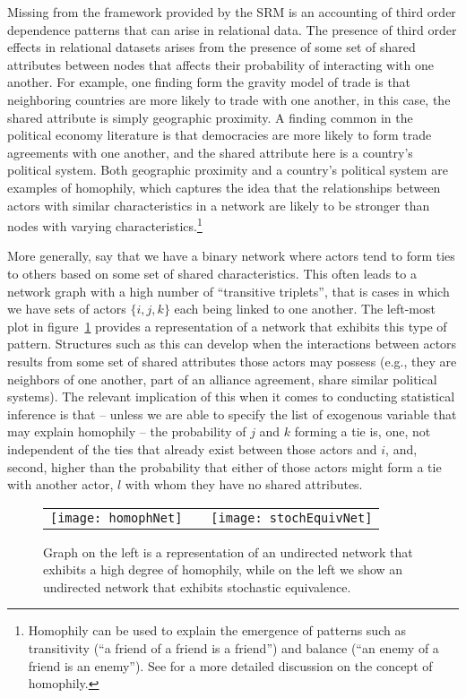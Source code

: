 Missing from the framework provided by the SRM is an accounting of third order dependence patterns that can arise in relational data. The presence of third order effects in relational datasets arises from the presence of some set of shared attributes between nodes that affects their probability of interacting with one another. For example, one finding form the gravity model of trade is that neighboring countries are more likely to trade with one another, in this case, the shared attribute is simply geographic proximity. A finding common in the political economy literature is that democracies are more likely to form trade agreements with one another, and the shared attribute here is a country's political system. Both geographic proximity and a country's political system are examples of homophily, which captures the idea that the relationships between actors with similar characteristics in a network are likely to be stronger than nodes with varying characteristics.\footnote{Homophily can be used to explain the emergence of patterns such as transitivity (``a friend of a friend is a friend'') and balance (``an enemy of a friend is an enemy''). See \citet{shalizi:thomas:2011} for a more detailed discussion on the concept of homophily.} 

More generally, say that we have a binary network where actors tend to form ties to others based on some set of shared characteristics. This often leads to a network graph with a high number of ``transitive triplets'', that is cases in which we have sets of actors $\{i,j,k\}$ each being linked to one another. The left-most plot in figure~\ref{fig:homphStochEquivNet} provides a representation of a network that exhibits this type of pattern. Structures such as this can develop when the interactions between actors results from some set of shared attributes those actors may possess (e.g., they are neighbors of one another, part of an alliance agreement, share similar political systems). The relevant implication of this when it comes to conducting statistical inference is that -- unless we are able to specify the list of exogenous variable that may explain homophily -- the probability of $j$ and $k$ forming a tie is, one, not independent of the ties that already exist between those actors and $i$, and, second, higher than the probability that either of those actors might form a tie with another actor, $l$ with whom they have no shared attributes. 

\begin{figure}[ht]
	\centering
	\begin{tabular}{lcr}
	\texttt{[image: homophNet]} & \hspace{2cm} &
	\texttt{[image: stochEquivNet]}	
	\end{tabular}
	\caption{Graph on the left is a representation of an undirected network that exhibits a high degree of homophily, while on the left we show an undirected network that exhibits stochastic equivalence. }
	\label{fig:homphStochEquivNet}
\end{figure}


